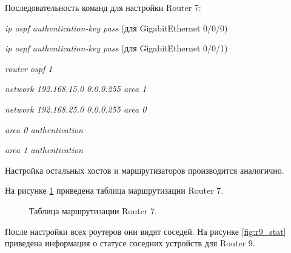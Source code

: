 \documentclass[a4paper,14pt]{article}
\begin{document}
Последовательность команд для настройки Router 7:

\textit{ip ospf authentication-key pass} (для GigabitEthernet 0/0/0)

\textit{ip ospf authentication-key pass} (для GigabitEthernet 0/0/1)

\textit{router ospf 1}

\textit{network 192.168.15.0 0.0.0.255 area 1}

\textit{network 192.168.25.0 0.0.0.255 area 0}

\textit{area 0 authentication}

\textit{area 1 authentication}

Настройка остальных хостов и маршрутизаторов производится аналогично.

На рисунке \ref{fig:r7_table} приведена таблица маршрутизации Router 7.

\newpage
\begin{figure}[!h]
    \caption{Таблица маршрутизации Router 7.}
    \label{fig:r7_table}
\end{figure}

\newpage
После настройки всех роутеров они видят соседей. На рисунке \ref{fig:r9_stat} приведена информация о статусе соседних устройств для Router 9.
\end{document}

